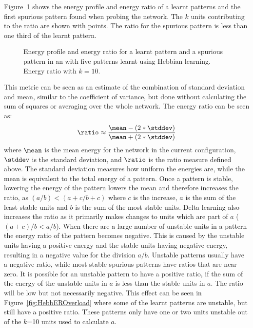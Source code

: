 Figure~\ref{fig:energyProfileSimple} shows the energy profile and energy ratio of a learnt patterns and the first spurious pattern found when probing the network. The $k$ units contributing to the ratio are shown with points.  The ratio for the spurious pattern is less than one third of the learnt pattern.

\begin{figure}
\center
\small
	
	\caption{Energy profile and energy ratio for a learnt pattern and a spurious pattern  in an \hopnet{100\pm}{} with five patterns learnt using Hebbian learning. Energy ratio with $k=10$.}
	\label{fig:energyProfileSimple}
\end{figure}


This metric can be seen as an estimate of the combination of standard deviation and mean, similar to the coefficient of variance, but done without calculating the sum of squares or averaging over the whole network.  The energy ratio can be seen as:
\begin{equation}
\ratio \approx \frac{\mean-(2 * \stddev)}{\mean+(2 * \stddev)}  
\end{equation}
where $\mean$ is the mean energy for the network in the current configuration, $\stddev$ is the standard deviation, and $\ratio$ is the ratio measure defined above.  The standard deviation measures how uniform the energies are, while the mean is equivalent to the total energy of a pattern.  Once a pattern is stable, lowering the energy of the pattern lowers the mean and therefore increases the ratio, as $(a/b) < (a+c/b+c)$ where $c$ is the increase, $a$ is the sum of the least stable units and $b$ is the sum of the most stable units.  Delta learning also increases the ratio as it primarily makes changes to units which are part of $a$ ($(a+c)/b < a/b$).  When there are a large number of unstable units in a pattern the energy ratio of the pattern becomes negative.  This is caused by the unstable units having a positive energy and the stable units having negative energy, resulting in a negative value for the division $a/b$. Unstable patterns usually have a negative ratio, while most stable spurious patterns have ratios that are near zero.  It is possible for an unstable pattern to have a positive ratio, if the sum of the energy of the unstable units in $a$ is less than the stable units in $a$.  The ratio will be low but not necessarily negative.  This effect can be seen in Figure~\ref{fig:HebbEROverload} where some of the learnt patterns are unstable, but still have a positive ratio.  These patterns only have one or two units unstable out of the $k$=10 units used to calculate $a$. 


